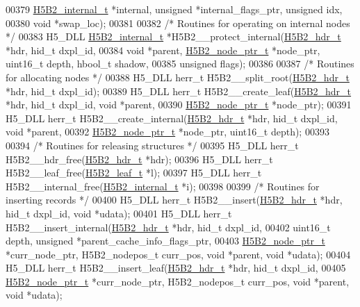 \begin{DoxyCode}
{{00379     \hyperlink{struct_h5_b2__internal__t}{H5B2\_internal\_t} *\textcolor{keyword}{internal}, \textcolor{keywordtype}{unsigned} *internal\_flags\_ptr, \textcolor{keywordtype}{unsigned} idx,
00380     \textcolor{keywordtype}{void} *swap\_loc);
00381 
00382 \textcolor{comment}{/* Routines for operating on internal nodes */}
00383 H5\_DLL \hyperlink{struct_h5_b2__internal__t}{H5B2\_internal\_t} *H5B2\_\_protect\_internal(\hyperlink{struct_h5_b2__hdr__t}{H5B2\_hdr\_t} *hdr, hid\_t dxpl\_id,
00384     \textcolor{keywordtype}{void} *parent, \hyperlink{struct_h5_b2__node__ptr__t}{H5B2\_node\_ptr\_t} *node\_ptr, uint16\_t depth, hbool\_t shadow,
00385     \textcolor{keywordtype}{unsigned} flags);
00386 
00387 \textcolor{comment}{/* Routines for allocating nodes */}
00388 H5\_DLL herr\_t H5B2\_\_split\_root(\hyperlink{struct_h5_b2__hdr__t}{H5B2\_hdr\_t} *hdr, hid\_t dxpl\_id);
00389 H5\_DLL herr\_t H5B2\_\_create\_leaf(\hyperlink{struct_h5_b2__hdr__t}{H5B2\_hdr\_t} *hdr, hid\_t dxpl\_id, \textcolor{keywordtype}{void} *parent,
00390     \hyperlink{struct_h5_b2__node__ptr__t}{H5B2\_node\_ptr\_t} *node\_ptr);
00391 H5\_DLL herr\_t H5B2\_\_create\_internal(\hyperlink{struct_h5_b2__hdr__t}{H5B2\_hdr\_t} *hdr, hid\_t dxpl\_id, \textcolor{keywordtype}{void} *parent,
00392     \hyperlink{struct_h5_b2__node__ptr__t}{H5B2\_node\_ptr\_t} *node\_ptr, uint16\_t depth);
00393 
00394 \textcolor{comment}{/* Routines for releasing structures */}
00395 H5\_DLL herr\_t H5B2\_\_hdr\_free(\hyperlink{struct_h5_b2__hdr__t}{H5B2\_hdr\_t} *hdr);
00396 H5\_DLL herr\_t H5B2\_\_leaf\_free(\hyperlink{struct_h5_b2__leaf__t}{H5B2\_leaf\_t} *l);
00397 H5\_DLL herr\_t H5B2\_\_internal\_free(\hyperlink{struct_h5_b2__internal__t}{H5B2\_internal\_t} *i);
00398 
00399 \textcolor{comment}{/* Routines for inserting records */}
00400 H5\_DLL herr\_t H5B2\_\_insert(\hyperlink{struct_h5_b2__hdr__t}{H5B2\_hdr\_t} *hdr, hid\_t dxpl\_id, \textcolor{keywordtype}{void} *udata);
00401 H5\_DLL herr\_t H5B2\_\_insert\_internal(\hyperlink{struct_h5_b2__hdr__t}{H5B2\_hdr\_t} *hdr, hid\_t dxpl\_id,
00402     uint16\_t depth, \textcolor{keywordtype}{unsigned} *parent\_cache\_info\_flags\_ptr,
00403     \hyperlink{struct_h5_b2__node__ptr__t}{H5B2\_node\_ptr\_t} *curr\_node\_ptr, H5B2\_nodepos\_t curr\_pos, \textcolor{keywordtype}{void} *parent, \textcolor{keywordtype}{void} *udata);
00404 H5\_DLL herr\_t H5B2\_\_insert\_leaf(\hyperlink{struct_h5_b2__hdr__t}{H5B2\_hdr\_t} *hdr, hid\_t dxpl\_id,
00405     \hyperlink{struct_h5_b2__node__ptr__t}{H5B2\_node\_ptr\_t} *curr\_node\_ptr, H5B2\_nodepos\_t curr\_pos, \textcolor{keywordtype}{void} *parent, \textcolor{keywordtype}{void} *udata);
}}
\end{DoxyCode}
